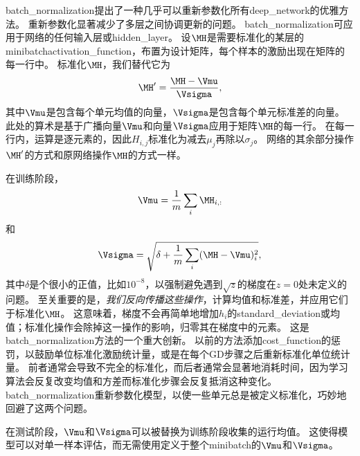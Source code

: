 
\gls{batch_normalization}提出了一种几乎可以重新参数化所有\gls{deep_network}的优雅方法。
重新参数化显著减少了多层之间协调更新的问题。
\gls{batch_normalization}可应用于网络的任何输入层或\gls{hidden_layer}。
设$\MH$是需要标准化的某层的\gls{minibatch}\gls{activation_function}，布置为设计矩阵，每个样本的激励出现在矩阵的每一行中。
标准化$\MH$，我们替代它为
\begin{equation}
\MH' = \frac{\MH - \Vmu}{\Vsigma},
\end{equation}
其中$\Vmu$是包含每个单元均值的向量，$\Vsigma$是包含每个单元标准差的向量。
此处的算术是基于广播向量$\Vmu$和向量$\Vsigma$应用于矩阵$\MH$的每一行。
在每一行内，运算是逐元素的，因此$H_{i,j}$标准化为减去$\mu_j$再除以$\sigma_j$。
网络的其余部分操作$\MH'$的方式和原网络操作$\MH$的方式一样。

在训练阶段，
\begin{equation}
    \Vmu = \frac{1}{m} \sum_i \MH_{i,:}
\end{equation}
和
\begin{equation}
    \Vsigma = \sqrt{ \delta + \frac{1}{m} \sum_i (\MH - \Vmu)_i^2 },
\end{equation}
其中$\delta$是个很小的正值，比如$10^{-8}$，以强制避免遇到$\sqrt{z}$的梯度在$z=0$处未定义的问题。
至关重要的是，\emph{我们反向传播这些操作}，计算均值和标准差，并应用它们于标准化$\MH$。
这意味着，梯度不会再简单地增加$h_i$的\gls{standard_deviation}或均值；标准化操作会除掉这一操作的影响，归零其在梯度中的元素。
这是\gls{batch_normalization}方法的一个重大创新。
以前的方法添加\gls{cost_function}的惩罚，以鼓励单位标准化激励统计量，或是在每个\gls{GD}步骤之后重新标准化单位统计量。
前者通常会导致不完全的标准化，而后者通常会显著地消耗时间，因为学习算法会反复改变均值和方差而标准化步骤会反复抵消这种变化。
\gls{batch_normalization}重新参数化模型，以使一些单元总是被定义标准化，巧妙地回避了这两个问题。


在测试阶段，$\Vmu$和$\Vsigma$可以被替换为训练阶段收集的运行均值。
这使得模型可以对单一样本评估，而无需使用定义于整个\gls{minibatch}的$\Vmu$和$\Vsigma$。


